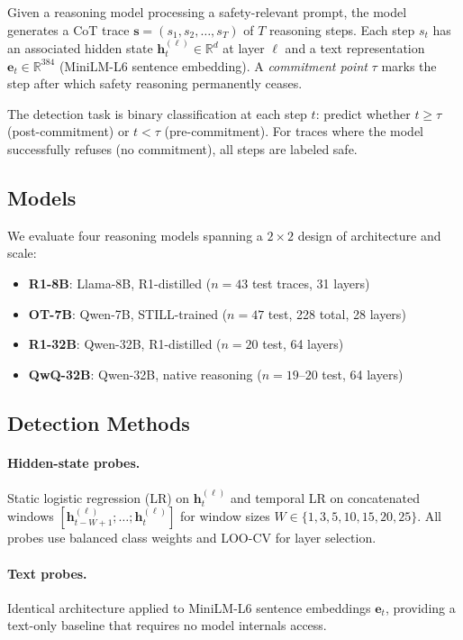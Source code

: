 \documentclass[11pt,a4paper]{article}
\begin{document}
Given a reasoning model processing a safety-relevant prompt, the model generates a CoT trace $\mathbf{s} = (s_1, s_2, \ldots, s_T)$ of $T$ reasoning steps.
Each step $s_t$ has an associated hidden state $\mathbf{h}_t^{(\ell)} \in \mathbb{R}^d$ at layer $\ell$ and a text representation $\mathbf{e}_t \in \mathbb{R}^{384}$ (MiniLM-L6 sentence embedding).
A \emph{commitment point} $\tau$ marks the step after which safety reasoning permanently ceases.

The detection task is binary classification at each step $t$: predict whether $t \geq \tau$ (post-commitment) or $t < \tau$ (pre-commitment).
For traces where the model successfully refuses (no commitment), all steps are labeled safe.

\subsection{Models}
\label{sec:models}

We evaluate four reasoning models spanning a $2 \times 2$ design of architecture and scale:

\begin{itemize}[nosep,leftmargin=*]
\item \textbf{R1-8B}: Llama-8B, R1-distilled ($n=43$ test traces, 31 layers)
\item \textbf{OT-7B}: Qwen-7B, STILL-trained ($n=47$ test, 228 total, 28 layers)
\item \textbf{R1-32B}: Qwen-32B, R1-distilled ($n=20$ test, 64 layers)
\item \textbf{QwQ-32B}: Qwen-32B, native reasoning ($n=19$--$20$ test, 64 layers)
\end{itemize}

\subsection{Detection Methods}
\label{sec:methods}

\paragraph{Hidden-state probes.}
Static logistic regression (LR) on $\mathbf{h}_t^{(\ell)}$ and temporal LR on concatenated windows $[\mathbf{h}_{t-W+1}^{(\ell)}; \ldots; \mathbf{h}_t^{(\ell)}]$ for window sizes $W \in \{1, 3, 5, 10, 15, 20, 25\}$.
All probes use balanced class weights and LOO-CV for layer selection.

\paragraph{Text probes.}
Identical architecture applied to MiniLM-L6 sentence embeddings $\mathbf{e}_t$, providing a text-only baseline that requires no model internals access.
\end{document}
